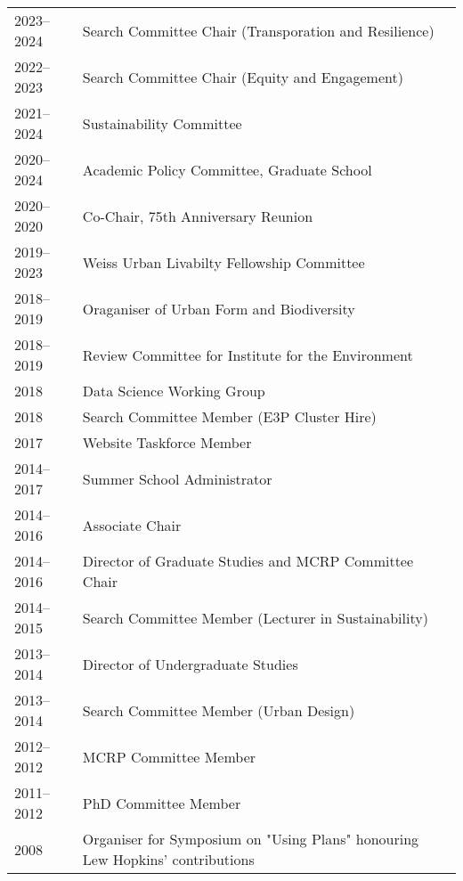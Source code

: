 \documentclass[11pt,a4paper,]{awesome-cv}
\begin{document}
\begin{tabular}{lp{11.3cm}}
  2023--2024 & Search Committee Chair (Transporation and Resilience) \\ 
  2022--2023 & Search Committee Chair (Equity and Engagement) \\ 
  2021--2024 & Sustainability Committee \\ 
  2020--2024 & Academic Policy Committee, Graduate School \\ 
  2020--2020 & Co-Chair, 75th Anniversary Reunion \\ 
  2019--2023 & Weiss Urban Livabilty Fellowship Committee \\ 
  2018--2019 & Oraganiser of Urban Form and Biodiversity \\ 
  2018--2019 & Review Committee for Institute for the Environment \\ 
  2018 & Data Science Working Group \\ 
  2018 & Search Committee Member (E3P Cluster Hire) \\ 
  2017 & Website Taskforce Member \\ 
  2014--2017 & Summer School Administrator \\ 
  2014--2016 & Associate Chair \\ 
  2014--2016 & Director of Graduate Studies and MCRP Committee Chair \\ 
  2014--2015 & Search Committee Member (Lecturer in Sustainability) \\ 
  2013--2014 & Director of Undergraduate Studies \\ 
  2013--2014 & Search Committee Member (Urban Design) \\ 
  2012--2012 & MCRP Committee Member \\ 
  2011--2012 & PhD Committee Member \\ 
  2008 & Organiser for Symposium on "Using Plans" honouring Lew Hopkins' contributions \\ 
  \end{tabular}


\label{LastPage}~
\end{document}

